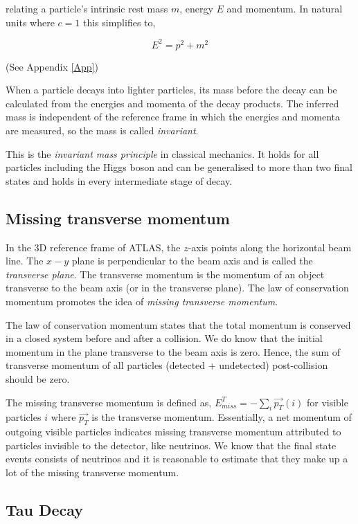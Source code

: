 relating a particle's intrinsic rest mass $m$, energy $E$ and momentum. In natural units where $c=1$ this simplifies to,

\begin{equation}
E^2 = p^2 + m^2 
\end{equation}

(See Appendix \ref{App})

When a particle decays into lighter particles, its mass before the decay can be calculated from the energies and momenta of the decay products. The inferred mass is independent of the reference frame in which the energies and momenta are measured, so the mass is called \textit{invariant}.

This is the \textit{invariant mass principle} in classical mechanics. It holds for all particles including the Higgs boson and can be generalised to more than two final states and holds in every intermediate stage of decay.   

\subsection{Missing transverse momentum}
\label{missing}

In the 3D reference frame of ATLAS, the $z$-axis points along the horizontal beam line. The $x-y$ plane is perpendicular to the beam axis and is called the \textit{transverse plane}. The transverse momentum is the momentum of an object transverse to the beam axis (or in the transverse plane). The law of conservation momentum promotes the idea of \textit{missing transverse momentum}.

The law of conservation momentum states that the total momentum is conserved in a closed system before and after a collision. We do know that the initial momentum in the plane transverse to the beam axis is zero. Hence, the sum of transverse momentum of all particles (detected + undetected) post-collision should be zero. 

The missing transverse momentum is defined as, $E_{miss}^{T} =  - \sum_{i} \vec{p_{T}}(i) $ for visible particles $i$ where $\vec{p_{T}}$ is the transverse momentum. Essentially, a net momentum of outgoing visible particles indicates missing transverse momentum attributed to particles invisible to the detector, like neutrinos. We know that the final state events consists of neutrinos and it is reasonable to estimate that they make up a lot of the missing transverse momentum.

\subsection{Tau Decay}
\label{taudecay}

